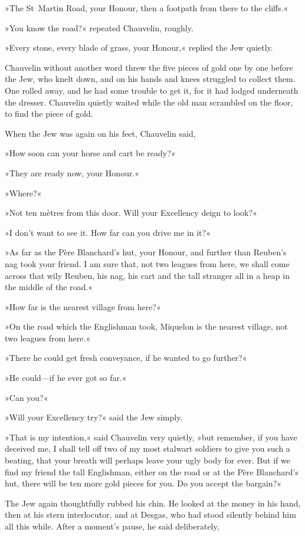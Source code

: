 »The St~Martin Road, your Honour, then a footpath from there to the cliffs.«

»You know the road?« repeated Chauvelin, roughly.

»Every stone, every blade of grass, your Honour,« replied the Jew quietly.

Chauvelin without another word threw the five pieces of gold one by one before the Jew, who knelt down, and on his hands and knees struggled to collect them. One rolled away, and he had some trouble to get it, for it had lodged underneath the dresser. Chauvelin quietly waited while the old man scrambled on the floor, to find the piece of gold.

When the Jew was again on his feet, Chauvelin said,\longdash


»How soon can your horse and cart be ready?«

»They are ready now, your Honour.«

»Where?«

»Not ten mètres from this door. Will your Excellency deign to look?«

»I don't want to see it. How far can you drive me in it?«

»As far as the Père Blanchard's hut, your Honour, and further than Reuben's nag took your friend. I am sure that, not two leagues from here, we shall come across that wily Reuben, his nag, his cart and the tall stranger all in a heap in the middle of the road.«

»How far is the nearest village from here?«

»On the road which the Englishman took, Miquelon is the nearest village, not two leagues from here.«

»There he could get fresh conveyance, if he wanted to go further?«

»He could\allowbreak---\allowbreak if he ever got so far.«

»Can you?«

»Will your Excellency try?« said the Jew simply.

»That is my intention,« said Chauvelin very quietly, »but remember, if you have deceived me, I shall tell off two of my most stalwart soldiers to give you such a beating, that your breath will perhaps leave your ugly body for ever. But if we find my friend the tall Englishman, either on the road or at the Père Blanchard's hut, there will be ten more gold pieces for you. Do you accept the bargain?«

The Jew again thoughtfully rubbed his chin. He looked at the money in his hand, then at his stern interlocutor, and at Desgas, who had stood silently behind him all this while. After a moment's pause, he said deliberately,\longdash


